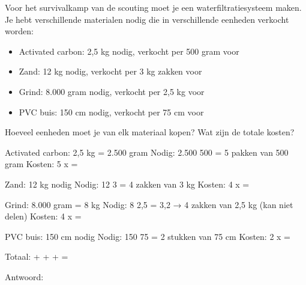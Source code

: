 \begin{opgave}
Voor het survivalkamp van de scouting moet je een waterfiltratiesysteem maken.
Je hebt verschillende materialen nodig die in verschillende eenheden verkocht worden:

\begin{itemize}
\item Activated carbon: 2,5 kg nodig, verkocht per 500 gram voor 
\item Zand: 12 kg nodig, verkocht per 3 kg zakken voor 
\item Grind: 8.000 gram nodig, verkocht per 2,5 kg voor 
\item PVC buis: 150 cm nodig, verkocht per 75 cm voor 
\end{itemize}

Hoeveel eenheden moet je van elk materiaal kopen? Wat zijn de totale kosten?
\end{opgave}

\begin{oplossing}
Activated carbon: 2,5 kg = 2.500 gram
Nodig: 2.500 \textrm{\textdiv} 500 = 5 pakken van 500 gram
Kosten: 5 x  = 

Zand: 12 kg nodig
Nodig: 12 \textrm{\textdiv} 3 = 4 zakken van 3 kg
Kosten: 4 x  = 

Grind: 8.000 gram = 8 kg
Nodig: 8 \textrm{\textdiv} 2,5 = 3,2 → 4 zakken van 2,5 kg (kan niet delen)
Kosten: 4 x  = 

PVC buis: 150 cm nodig
Nodig: 150 \textrm{\textdiv} 75 = 2 stukken van 75 cm
Kosten: 2 x  = 

Totaal:  +  +  +  = 

Antwoord: 
\end{oplossing}